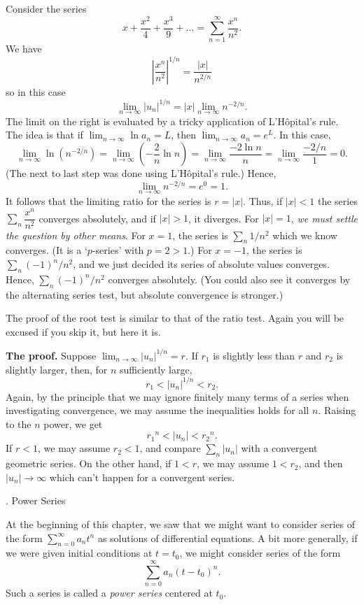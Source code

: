 \nextex
{}  Consider the series
$$
x + \frac {x^2}4 + \frac {x^3}9 + \dots = 
\sum_{n=1}^\infty \frac{x^n}{n^2}.
$$
We have
$$
\left|\frac {x^n}{n^2}\right|^{1/n} = \frac{|x|}{n^{2/n}}
$$
so in this case
$$
\lim_{n\to\infty} |u_n|^{1/n} = |x|\lim_{n\to\infty} n^{-2/n}.
$$
The limit on the right is evaluated by a tricky application
of L'H\^opital's rule.   The idea is that if $\lim_{n\to\infty} \ln a_n
= L$, then $\lim_{n\to\infty} a_n = e^L$.  In this case,
$$
\lim_{n\to\infty} \ln(n^{-2/n}) = \lim_{n\to\infty}(-\frac 2n \ln n)
= \lim_{n\to\infty}\frac{-2\ln n}n = \lim_{n\to\infty}\frac{-2/n}1 = 0.
$$
(The next to last step was done using L'H\^opital's rule.)  Hence,
$$
\lim_{n\to\infty} n^{-2/n} = e^0 = 1.
$$
It follows that the limiting ratio for the series is $r = |x|$.
Thus, if $|x| < 1$ the series $\sum_n \dfrac{x^n}{n^2}$ converges
absolutely, and if $|x| > 1$, it diverges.  For $|x| = 1$,
{\it we must settle the question by other means}.  For
$x = 1$, the series is $\sum_n 1/n^2$ which we know converges.
(It is a `$p$-series' with $p = 2 > 1$.)  For $x = -1$, 
the series is $\sum_n (-1)^n/n^2$, and we just decided its
series of absolute values converges.  Hence, $\sum_n (-1)^n/n^2$
converges absolutely.  (You could also see it converges by the
alternating series test, but absolute convergence is stronger.)
\endexample

The proof of the root test is similar to that of the ratio test.
Again you will be excused if you skip it, but here it is.

{\bf The proof.}
Suppose $\lim_{n\to\infty} |u_n|^{1/n} = r$.   If
$r_1$ is slightly less than $r$ and $r_2$ is slightly larger,
then, for $n$ sufficiently large,
$$
   r_1 < |u_n|^{1/n} < r_2.
$$
Again, by the principle that we may ignore finitely many terms of
a series when investigating convergence,
we may assume the inequalities holds for all $n$. Raising to the $n$ power,
we get
$$
   r_1{}^n < |u_n| < r_2{}^n.
$$
If $r < 1$, we may assume $r_2 < 1$, and compare $\sum_n |u_n|$
with a convergent geometric series.   On the other hand, if
$1 < r$, we may assume $1 < r_2$, and then $|u_n| \to \infty$
which can't happen for a convergent series.
\bigskip

\bigskip

\head \sn. Power Series \endhead

At the beginning of this chapter, we saw that we might want to
consider series of the form $\sum_{n=0}^\infty a_n t^n$ as solutions
of differential equations.  A bit more generally, if we were
given initial conditions  at $t = t_0$, we might
consider series of the form
$$
\sum_{n = 0}^\infty a_n (t - t_0)^n.
$$
Such a series is called a {\it power series\/} centered at $t_0$.
%

